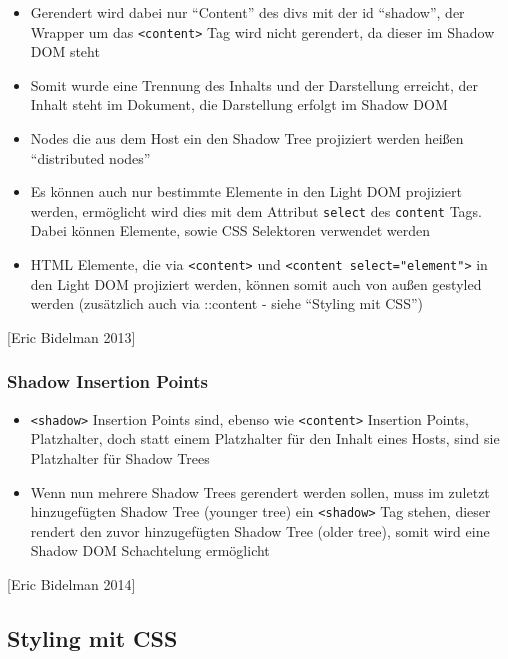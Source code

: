 \begin{itemize}
\tightlist
\item
  Gerendert wird dabei nur ``Content'' des divs mit der id ``shadow'',
  der Wrapper um das \texttt{\textless{}content\textgreater{}} Tag wird
  nicht gerendert, da dieser im Shadow DOM steht
\item
  Somit wurde eine Trennung des Inhalts und der Darstellung erreicht,
  der Inhalt steht im Dokument, die Darstellung erfolgt im Shadow DOM
\item
  Nodes die aus dem Host ein den Shadow Tree projiziert werden heißen
  ``distributed nodes''
\item
  Es können auch nur bestimmte Elemente in den Light DOM projiziert
  werden, ermöglicht wird dies mit dem Attribut \texttt{select} des
  \texttt{content} Tags. Dabei können Elemente, sowie CSS Selektoren
  verwendet werden
\item
  HTML Elemente, die via \texttt{\textless{}content\textgreater{}} und
  \texttt{\textless{}content\ select="element"\textgreater{}} in den
  Light DOM projiziert werden, können somit auch von außen gestyled
  werden (zusätzlich auch via ::content - siehe ``Styling mit CSS'')
\end{itemize}

{[}Eric Bidelman 2013{]}

\subsubsection{Shadow Insertion Points}\label{shadow-insertion-points}

\begin{itemize}
\tightlist
\item
  \texttt{\textless{}shadow\textgreater{}} Insertion Points sind, ebenso
  wie \texttt{\textless{}content\textgreater{}} Insertion Points,
  Platzhalter, doch statt einem Platzhalter für den Inhalt eines Hosts,
  sind sie Platzhalter für Shadow Trees
\item
  Wenn nun mehrere Shadow Trees gerendert werden sollen, muss im zuletzt
  hinzugefügten Shadow Tree (younger tree) ein
  \texttt{\textless{}shadow\textgreater{}} Tag stehen, dieser rendert
  den zuvor hinzugefügten Shadow Tree (older tree), somit wird eine
  Shadow DOM Schachtelung ermöglicht
\end{itemize}

{[}Eric Bidelman 2014{]}

\subsection{Styling mit CSS}\label{styling-mit-css}

